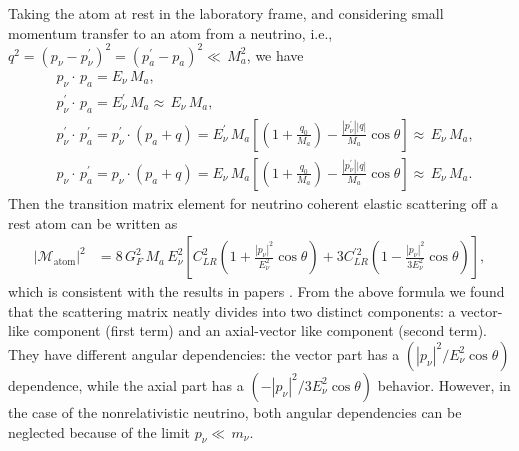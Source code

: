 Taking the atom at rest in the laboratory frame, and considering small momentum transfer to an atom from a neutrino, i.e., $q^2=(p_\nu-p^\prime_\nu)^2=(p_a^\prime-p_a)^2\ll\,M^2_a$, we have
\begin{align}
&p_\nu\cdot\,p_a=E_\nu\,M_a,\\
&p_\nu^\prime\cdot\,p_a=E_\nu^\prime\,M_a\approx\,E_\nu\,M_a,\\
&p^\prime_\nu\cdot\,p^\prime_a=p^\prime_\nu\cdot(p_a+q)=E^\prime_\nu\,M_a\left[\left(1+\frac{q_0}{M_a}\right)-\frac{|p^\prime_\nu||q|}{M_a}\cos\theta\right]\approx\,E_\nu\,M_a,\\
&p_\nu\cdot\,p^\prime_a=p_\nu\cdot(p_a+q)=E_\nu\,M_a\left[\left(1+\frac{q_0}{M_a}\right)-\frac{|p^\prime_\nu||q|}{M_a}\cos\theta\right]\approx\,E_\nu\,M_a.
\end{align}
Then the transition matrix element for neutrino coherent elastic scattering off a rest atom can be written as
\begin{align}\label{M_general}
|\mathcal{M}_{\mathrm{atom}}|^2&=8\,G^2_F\,M_a\,E_\nu^2\left[C^2_{LR}\left(1+\frac{|p_\nu|^2}{E^2_\nu}\cos\theta\right)+3C^{\prime2}_{LR}\left(1-\frac{|p_\nu|^2}{3E_\nu^2}\cos\theta\right)\right],
\end{align}
which is consistent with the results in papers \cite{PhysRevD.38.32,Lewis:1979mu,Papavassiliou:2005cs,Smith:1984gym}.
From the above formula we found that the scattering matrix neatly divides into two distinct components: a vector-like component (first term) and an axial-vector like component (second term). They have different angular dependencies: the vector part has a $\left({|p_\nu|^2}/{E^2_\nu}\cos\theta\right)$ dependence, while the axial part has a $\left(-{|p_\nu|^2}/{3E_\nu^2}\cos\theta\right)$ behavior. However, in the case of the nonrelativistic neutrino, both angular dependencies can be neglected because of the limit $p_\nu\ll\,m_\nu$. 


